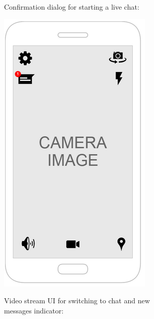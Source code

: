 \documentclass{article}
\begin{document}
\begin{figure}[h]
\begin{subfigure}{.5\textwidth}
		Confirmation dialog for starting a live chat:
\end{subfigure}%
\begin{subfigure}{.5\textwidth}
  \centering
  \includegraphics[width=.9\linewidth]{"Chat/8"}
	
	Video stream UI for switching to chat and new messages indicator:
\end{subfigure}
\end{figure}	
\clearpage
\end{document}
